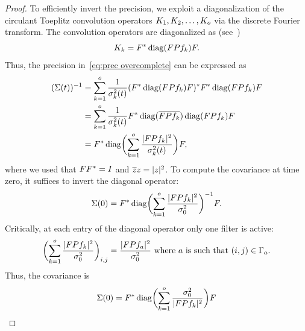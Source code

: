 \begin{proof}
	To efficiently invert the precision, we exploit a diagonalization of the circulant Toeplitz convolution operators \( K_{\num{1}}, K_{\num{2}}, \dotsc, K_{o} \) via the discrete Fourier transform.
	The convolution operators are diagonalized as (see~\cite[section 5.5.4]{Nikolski2020-dx})
	\begin{equation}
		K_k = F^{\ast} \operatorname{diag}(F P f_k) F.
	\end{equation}
	Thus, the precision in~\cref{eq:prec overcomplete} can be expressed as
	\begin{equation}
		\begin{aligned}
			(\Sigma(t))^{-1} &= \sum_{k=\num{1}}^{o} \frac{1}{\sigma_k^{\num{2}}(t)} (F^{\ast} \operatorname{diag}(F P f_k) F)^{\ast}F^{\ast} \operatorname{diag}(F P f_k) F \\
							 &= \sum_{k=\num{1}}^{o} \frac{1}{\sigma_k^{\num{2}}(t)} F^{\ast} \operatorname{diag}(\overline{F P f_k}) \operatorname{diag}(F P f_k) F \\
							 &= F^{\ast}\operatorname{diag}\biggl(\sum_{k=\num{1}}^o \frac{|F P f_k|^{\num{2}}}{\sigma^{\num{2}}_k(t)}\biggr) F,
		\end{aligned}
		\label{eq:fourier diagonalization}
	\end{equation}
	where we used that \( F F^{\ast} = I \) and \( \overline{z}z = |z|^{\num{2}} \).
	To compute the covariance at time zero, it suffices to invert the diagonal operator:
	\begin{equation}
		\Sigma(\num{0}) = F^{\ast}\operatorname{diag}\biggl(\sum_{k=\num{1}}^o \frac{|F P f_k|^{\num{2}}}{\sigma^{\num{2}}_{\num{0}}}\biggr)^{-1} F.
	\end{equation}
	Critically, at each entry of the diagonal operator only one filter is active:
	\begin{equation}
		\biggl( \sum_{k=\num{1}}^\NumExperts \frac{|\Fourier P \Filter_k|^{\num{2}}}{\sigma^{\num{2}}_{\num{0}}} \biggr)_{i, j} = \frac{|\Fourier P \Filter_{a}|^{\num{2}}}{\sigma^{\num{2}}_{\num{0}}}\ \text{where \( a \) is such that}\ (i, j) \in \Gamma_a.
	\end{equation}
	Thus, the covariance is
	\begin{equation}
		\Sigma(\num{0}) = \Adjoint{\Fourier}\diag\biggl(\sum_{k=\num{1}}^\NumExperts \frac{\sigma^{\num{2}}_{\num{0}}}{|\Fourier P \Filter_k|^{\num{2}}}\biggr) \Fourier

\end{equation}
\end{proof}
